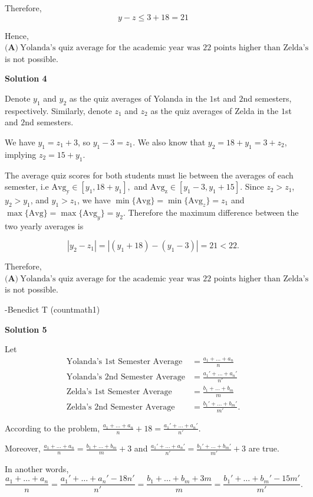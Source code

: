 \begin{enumerate}
 Therefore, 
 \[y - z \le 3 + 18 = 21\]

 Hence, $\boxed{\textbf{(A)}~\text{Yolanda's quiz average for the academic year was 22 points higher than Zelda's}}$ is not possible.

 



\textbf{Solution 4}

Denote $y_1$ and $y_2$ as the quiz averages of Yolanda in the $1$st and $2$nd semesters, respectively. Similarly, denote $z_1$ and $z_2$ as the quiz averages of Zelda in the $1$st and $2$nd semesters. 

 We have $y_1 = z_1 + 3$, so $y_1 - 3 = z_1$. We also know that $y_2 = 18 +y_1 = 3 + z_2$, implying $z_2 = 15 + y_1$.

 The average quiz scores for both students must lie between the averages of each semester, i.e $\mathrm{Avg_{y}}\in[y_1, 18+y_1],$ and $\mathrm{Avg_{z}}\in[y_1-3, y_1+15].$ Since $z_2>z_1$, $y_2 > y_1$, and $y_1>z_1$, we have $\min\{\mathrm{Avg}\} = \min\{\mathrm{Avg}_z\} = z_1$ and $\max\{\mathrm{Avg}\} = \max\{\mathrm{Avg}_y\} = y_2$. Therefore the maximum difference between the two yearly averages is 

 
 \[|y_2 - z_1| = |(y_1 + 18)-(y_1-3)| = 21 < 22.\]

 Therefore, $\boxed{\textbf{(A)}~\text{Yolanda's quiz average for the academic year was 22 points higher than Zelda's}}$ is not possible.

 -Benedict T (countmath1)

 



\textbf{Solution 5}

Let\begin{align*}\text{Yolanda's 1st Semester Average} &= \frac{a_1+\dots+a_n}{n} \\\text{Yolanda's 2nd Semester Average} &= \frac{a_1'+\dots+a_n'}{n'} \\\text{Zelda's 1st Semester Average} &= \frac{b_1+\dots+b_m}{m} \\\text{Zelda's 2nd Semester Average} &= \frac{b_1'+\dots+b_m'}{m'}.\end{align*}


 According to the problem, $\frac{a_1+\dots+a_n}{n}+18=\frac{a_1'+\dots+a_n'}{n'}$.

 Moreover, $\frac{a_1+\dots+a_n}{n}=\frac{b_1+\dots+b_m}{m}+3$ and $\frac{a_1'+\dots+a_n'}{n'}=\frac{b_1'+\dots+b_m'}{m'}+3$ are true.

 In another words,
 \[\frac{a_1+\dots+a_n}{n}=\frac{a_1'+\dots+a_n'-18n'}{n'}=\frac{b_1+\dots+b_m+3m}{m}= \frac{b_1'+\dots+b_m'-15m'}{m'}.\]


\end{enumerate}
